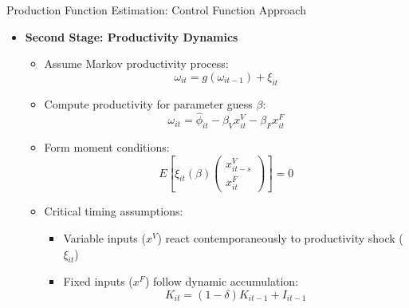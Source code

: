 \documentclass[aspectratio=169]{beamer}  %
\begin{document}
\begin{frame}{Production Function Estimation: Control Function Approach}
\begin{itemize}
    \item \textbf{Second Stage: Productivity Dynamics}
    \begin{itemize}
        \item Assume Markov productivity process:
        \[
            \omega_{it} = g(\omega_{it-1}) + \xi_{it}
        \]
        
        \item Compute productivity for parameter guess $\beta$:
        \[
            \omega_{it} = \hat{\phi}_{it} - \beta_V x_{it}^V - \beta_F x_{it}^F
        \]
        
        \item Form moment conditions:
        \[
            E\left[\xi_{it}(\beta) \begin{pmatrix} x_{it-s}^V \\ x_{it}^F \end{pmatrix}\right] = 0
        \]
        
        \item Critical timing assumptions:
        \begin{itemize}
            \item Variable inputs ($x^V$) react contemporaneously to productivity shock ($\xi_{it}$)
            \item Fixed inputs ($x^F$) follow dynamic accumulation:
            \[
                K_{it} = (1-\delta)K_{it-1} + I_{it-1}
            \]
        \end{itemize}
    \end{itemize}
\end{itemize}
\end{frame}
\end{document}
